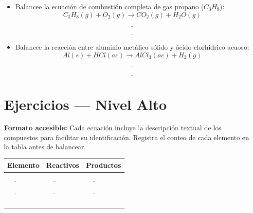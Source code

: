 \documentclass[
  spanish,
  letterpaper,
  12pt,
  oneside,
  open=any]{scrbook}
\newcounter{none} %
\newcommand{\setcolorsection}[2]{%
  \definecolor{currentsectionbg}{HTML}{#1}%
  \definecolor{currentsectionborder}{HTML}{#2}%
}
\begin{document}
\begin{itemize}
\item
  Balancee la ecuación de combustión completa de gas propano
  (\(C_3H_8\)): \[C_3H_8(g) + O_2(g) \rightarrow CO_2(g) + H_2O(g)\]

  \[\underline{\hspace{6cm}}\]

  \[\underline{\hspace{6cm}}\]
\item
  Balancee la reacción entre aluminio metálico sólido y ácido
  clorhídrico acuoso:
  \[Al(s) + H{Cl}(ac) \rightarrow Al{Cl}_3(ac) + H_2(g)\]

  \[\underline{\hspace{6cm}}\]

  \[\underline{\hspace{6cm}}\]
\end{itemize}

\setcolorsection{b2e0d8}{98ccc4}

\section{Ejercicios --- Nivel Alto}\label{ejercicios-nivel-alto-1}

\textbf{Formato accesible:} Cada ecuación incluye la descripción textual
de los compuestos para facilitar su identificación. Registra el conteo
de cada elemento en la tabla antes de balancear.

{\def\LTcaptype{none} %
\begin{longtable}[]{@{}
  >{\raggedright\arraybackslash}p{}
  >{\raggedright\arraybackslash}p{}
  >{\raggedright\arraybackslash}p{}@{}}
\toprule\noalign{}
\begin{minipage}[b]{\linewidth}\raggedright
Elemento
\end{minipage} & \begin{minipage}[b]{\linewidth}\raggedright
Reactivos
\end{minipage} & \begin{minipage}[b]{\linewidth}\raggedright
Productos
\end{minipage} \\
\midrule\noalign{}
\endhead
\bottomrule\noalign{}
\endlastfoot
\(\underline{\hspace{1cm}}\) & \(\underline{\hspace{1cm}}\) &
\(\underline{\hspace{1cm}}\) \\
\(\underline{\hspace{1cm}}\) & \(\underline{\hspace{1cm}}\) &
\(\underline{\hspace{1cm}}\) \\
\(\underline{\hspace{1cm}}\) & \(\underline{\hspace{1cm}}\) &
\(\underline{\hspace{1cm}}\) \\
\end{longtable}
}
\end{document}
